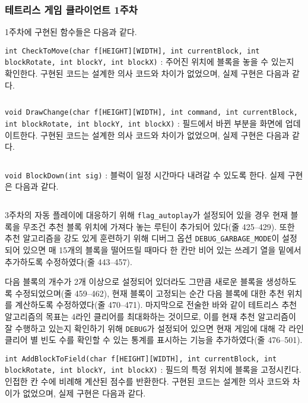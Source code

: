 \subsubsection{테트리스 게임 클라이언트 1주차} 1주차에 구현된 함수들은 다음과 같다.

\texttt{int CheckToMove(char f[HEIGHT][WIDTH], int currentBlock, int blockRotate, int blockY, int blockX)}
: 주어진 위치에 블록을 놓을 수 있는지 확인한다. 구현된 코드는 설계한 의사 코드와 차이가 없었으며, 실제 구현은 다음과 같다.

\inputminted[xleftmargin=\parindent,linenos,firstline=395,lastline=410]{c}{inc-sources/tetris.c}

\texttt{void DrawChange(char f[HEIGHT][WIDTH], int command, int currentBlock, int blockRotate, int blockY, int blockX)}
: 필드에서 바뀐 부분을 화면에 업데이트한다. 구현된 코드는 설계한 의사 코드와 차이가 없었으며, 실제 구현은 다음과 같다.

\inputminted[xleftmargin=\parindent,linenos,firstline=418,lastline=422]{c}{inc-sources/tetris.c}

\texttt{void BlockDown(int sig)}
: 블럭이 일정 시간마다 내려갈 수 있도록 한다. 실제 구현은 다음과 같다.

\inputminted[xleftmargin=\parindent,linenos,firstline=424,lastline=502]{c}{inc-sources/tetris.c}

3주차의 자동 플레이에 대응하기 위해 \texttt{flag_autoplay}가 설정되어 있을 경우 현재 블록을 무조건 추천 블록 위치에 가져다 놓는 루틴이 추가되어 있다(줄 425--429).
또한 추천 알고리즘을 강도 있게 훈련하기 위해 디버그 옵션 \texttt{DEBUG_GARBAGE_MODE}이 설정되어 있으면 매 15개의 블록을 떨어뜨릴 때마다
한 칸만 비어 있는 쓰레기 열을 밑에서 추가하도록 수정하였다(줄 443--457). 

다음 블록의 개수가 2개 이상으로 설정되어 있더라도 그만큼 새로운 블록을 생성하도록 수정되었으며(줄 459--462), 현재 블록이 고정되는 순간 다음 블록에 대한
추천 위치를 계산하도록 수정하였다(줄 470--471). 마지막으로 전술한 바와 같이 테트리스 추천 알고리즘의 목표는 4라인 클리어를 최대화하는 것이므로,
이를 현재 추천 알고리즘이 잘 수행하고 있는지 확인하기 위해 \texttt{DEBUG}가 설정되어 있으면 현재 게임에 대해 각 라인 클리어 별 빈도 수를
확인할 수 있는 통계를 표시하는 기능을 추가하였다(줄 476--501).

\texttt{int AddBlockToField(char f[HEIGHT][WIDTH], int currentBlock, int blockRotate, int blockY, int blockX)}
: 필드의 특정 위치에 블록을 고정시킨다. 인접한 칸 수에 비례해 계산된 점수를 반환한다. 구현된 코드는 설계한 의사 코드와 차이가 없었으며, 실제 구현은 다음과 같다.

